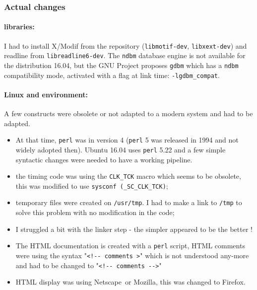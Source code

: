 \hypertarget{actual-changes}{%
\subsubsection{Actual changes}\label{actual-changes}}

\paragraph{libraries:} I had to install X/Modif from the repository
(\texttt{libmotif-dev}, \texttt{libxext-dev}) and readline from
\texttt{libreadline6-dev}. The \texttt{ndbm} database engine is not
available for the distribution 16.04, but the GNU Project proposes \texttt{gdbm} which has a
\texttt{ndbm} compatibility mode, activated with a flag at link time:
\texttt{-lgdbm\_compat}.

\paragraph{Linux and environment:} A few constructs were obsolete or not
adapted to a modern system and had to be adapted.

\begin{itemize}
\item
  At that time, \texttt{perl} was in version 4 (\texttt{perl} 5 was
  released in 1994 and not widely adopted then). Ubuntu 16.04
  uses \texttt{perl} 5.22 and a few simple syntactic changes were
  needed to have a working pipeline.
\item
  the timing code was using the \texttt{CLK\_TCK} macro which seems to
  be obsolete, this was modified to use
  \texttt{sysconf\ (\_SC\_CLK\_TCK)};
\item
  temporary files were created on \texttt{/usr/tmp}. I had to make a
  link to \texttt{/tmp} to solve this problem with no modification in
  the code;
\item
  I struggled a bit with the linker step - the simpler appeared to be
  the better !
\item
  The HTML documentation is created with a \texttt{perl} script, HTML
  comments were using the syntax
  "\texttt{\textless{}!-\/-\ comments\ \textgreater{}}" which is not
  understood any-more and had to be changed to
  "\texttt{\textless{}!-\/-\ comments\ -\/-\textgreater{}}"
\item
  HTML display was using Netscape\texttrademark\ or Mozilla\texttrademark, this was changed to
  Firefox\texttrademark . 
\end{itemize}

